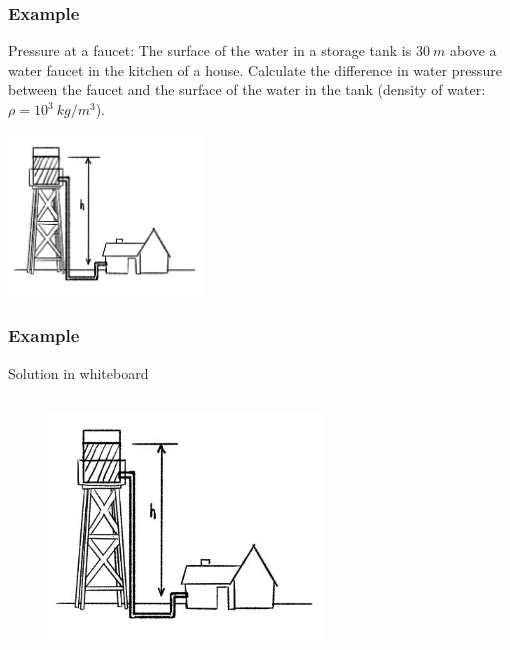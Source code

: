 \documentclass[]{beamer}
\begin{document}
\begin{frame}
\frametitle{Example \theexample }
Pressure at a faucet:  The surface of the water in a storage tank is $30~m$ above a water faucet in the kitchen of a house. Calculate the difference
in water pressure between the faucet and the surface of the water in the tank (density of water:$\rho=10^3~kg/m^3$).

 \begin{center}
  \includegraphics[height=1.7in]{images2/example1.jpg}
\end{center}




  \end{frame}




\begin{frame}
\frametitle{Example \theexample }
\textcolor{mypink1}{Solution in whiteboard}




\begin{columns}[c]
  \column{2in}  %

  \begin{figure}[h!]
    \includegraphics[height=2.4in]{images2/example1.jpg}
\end{figure} 

  \column{2in}


  \end{columns}





  \end{frame}
\end{document}
